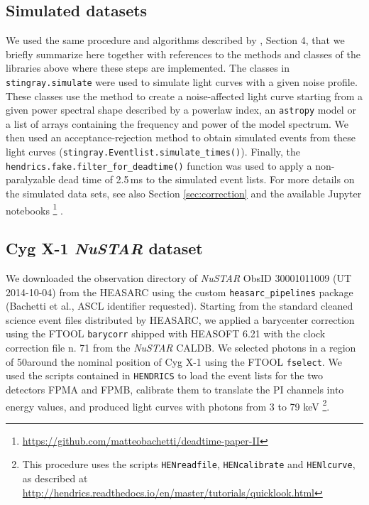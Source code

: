 \documentclass[twocolumn]{aastex61}
\newcommand{\project}[1]{\textsl{#1}}
\newcommand{\nustar}{\project{NuSTAR}\xspace}
\begin{document}
\subsection{Simulated datasets}
We used the same procedure and algorithms described by \citet{Bachetti+15}, Section 4, that we briefly summarize here together with references to the methods and classes of the libraries above where these steps are implemented.
The classes in \texttt{stingray.simulate} were used to simulate light curves with a given noise profile. 
These classes use the \citet{timmer1995} method to create a noise-affected light curve starting from a given power spectral shape described by a powerlaw index, an \texttt{astropy} model or a list of arrays containing the frequency and power of the model spectrum.
We then used an acceptance-rejection method to obtain simulated events from these light curves (\texttt{stingray.Eventlist.simulate\_times()}). 
Finally, the \texttt{hendrics.fake.filter\_for\_deadtime()} function was used to apply a non-paralyzable dead time of 2.5\,ms to the simulated event lists. For more details on the simulated data sets, see also Section \ref{sec:correction} and the available Jupyter notebooks%
\footnote{\href{https://github.com/matteobachetti/deadtime-paper-II}{https://github.com/matteobachetti/deadtime-paper-II}} \citep[for a description of Jupyter notebooks, see][]{kluyver2016jupyter}.

\subsection{Cyg X-1 \nustar dataset}
We downloaded the observation directory of \nustar ObsID 30001011009 (UT 2014-10-04) from the HEASARC using the custom \texttt{heasarc\_pipelines} package (Bachetti et al., ASCL identifier requested).
Starting from the standard cleaned science event files distributed by HEASARC, we applied a barycenter correction using the FTOOL \texttt{barycorr} shipped with HEASOFT 6.21 with the clock correction file n. 71 from the \nustar CALDB.
We selected photons in a region of 50\arcsec around the nominal position of Cyg X-1 using the FTOOL \texttt{fselect}.
We used the scripts contained in \texttt{HENDRICS} to load the event lists for the two detectors FPMA and FPMB, calibrate them to translate the PI channels into energy values, and produced light curves with photons from 3 to 79 keV%
\footnote{This procedure uses the scripts \texttt{HENreadfile}, \texttt{HENcalibrate} and \texttt{HENlcurve}, as described at\\ \href{http://hendrics.readthedocs.io/en/master/tutorials/quicklook.html}{http://hendrics.readthedocs.io/en/master/tutorials/quicklook.html}}.
\end{document}
